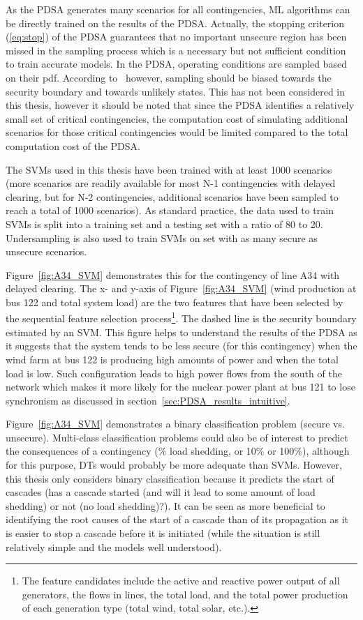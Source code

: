 As the PDSA generates many scenarios for all contingencies, ML algorithms can be directly trained on the results of the PDSA. Actually, the stopping criterion (\ref{eq:stop}) of the PDSA guarantees that no important unsecure region has been missed in the sampling process which is a necessary but not sufficient condition to train accurate models. In the PDSA, operating conditions are sampled based on their pdf. According to~\cite{Bugaje} however, sampling should be biased towards the security boundary and towards unlikely states. This has not been considered in this thesis, however it should be noted that since the PDSA identifies a relatively small set of critical contingencies, the computation cost of simulating additional scenarios for those critical contingencies would be limited compared to the total computation cost of the PDSA.

The SVMs used in this thesis have been trained with at least 1000 scenarios (more scenarios are readily available for most N-1 contingencies with delayed clearing, but for N-2 contingencies, additional scenarios have been sampled to reach a total of 1000 scenarios). As standard practice, the data used to train SVMs is split into a training set and a testing set with a ratio of 80 to 20. Undersampling is also used to train SVMs on set with as many secure as unsecure scenarios.

Figure~\ref{fig:A34_SVM} demonstrates this for the contingency of line A34 with delayed clearing. The x- and y-axis of Figure~\ref{fig:A34_SVM} (wind production at bus 122 and total system load) are the two features that have been selected by the sequential feature selection process\footnote{The feature candidates include the active and reactive power output of all generators, the flows in lines, the total load, and the total power production of each generation type (total wind, total solar, etc.).}. The dashed line is the security boundary estimated by an SVM. This figure helps to understand the results of the PDSA as it suggests that the system tends to be less secure (for this contingency) when the wind farm at bus 122 is producing high amounts of power and when the total load is low. Such configuration leads to high power flows from the south of the network which makes it more likely for the nuclear power plant at bus 121 to lose synchronism as discussed in section~\ref{sec:PDSA_results_intuitive}.

Figure~\ref{fig:A34_SVM} demonstrates a binary classification problem (secure vs. unsecure). Multi-class classification problems could also be of interest to predict the consequences of a contingency (\% load shedding, or 10\% or 100\%), although for this purpose, DTs would probably be more adequate than SVMs. However, this thesis only considers binary classification because it predicts the start of cascades (\ie has a cascade started (and will it lead to some amount of load shedding) or not (no load shedding)?). It can be seen as more beneficial to identifying the root causes of the start of a cascade than of its propagation as it is easier to stop a cascade before it is initiated (while the situation is still relatively simple and the models well understood).

